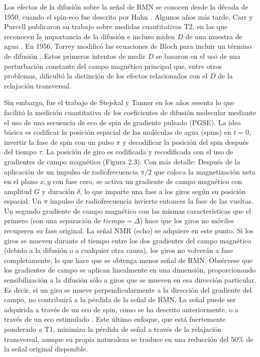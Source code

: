 Los efectos de la difusión sobre la señal de RMN se conocen desde la década de 1950, cuando el spin-eco fue descrito por Hahn \cite{Hahn_1950}. Algunos años más tarde, Carr y Purcell publicaron su trabajo sobre medidas cuantitativas T2, en las que reconocen la importancia de la difusión e incluso miden $D$ de una muestra de agua \cite{Carr_1954}. En 1956, Torrey modificó las ecuaciones de Bloch para incluir un término de difusión \cite{Torrey_1956}. Estos primeros intentos de medir $D$ se basaron en el uso de una perturbación constante del campo magnético principal que, entre otros problemas, dificultó la distinción de los efectos relacionados con el $D$ de la relajación transversal.

Sin embargo, fue el trabajo de Stejskal y Tanner \cite{Stejskal_1965} en los años sesenta lo que facilitó la medición cuantitativa de los coeficientes de difusión molecular mediante el uso de una secuencia de eco de spin de gradiente pulsado (PGSE). La idea básica es codificar la posición espacial de las moléculas de agua (spins) en $t = 0$, invertir la fase de spin con un pulso \(\pi\) y decodificar la posición del spin después del tiempo \(\tau\). La posición de giro es codificada y recodificada con el uso de gradientes de campo magnético (Figura 2.3). Con más detalle: Después de la aplicación de un impulso de radiofrecuencia $\pi/2$ que coloca la magnetización neta en el plano $x, y$ con fase cero, se activa un gradiente de campo magnético con amplitud $G$ y duración \(\delta\), lo que imparte una fase a los giros según su posición espacial. Un \(\pi\) impulso de radiofrecuencia invierte entonces la fase de las vueltas. Un segundo gradiente de campo magnético con las mismas características que el primero (con una separación de $tiempo = \Delta$) hace que los giros no móviles recuperen su fase original. La señal NMR (echo) se adquiere en este punto. Si los giros se mueven durante el tiempo entre los dos gradientes del campo magnético (debido a la difusión o a cualquier otra causa), los giros no volverán a fase completamente, lo que hace que se obtenga menos señal de RMN. Obsérvese que los gradientes de campo se aplican linealmente en una dimensión, proporcionando sensibilización a la difusión sólo a giros que se mueven en esa dirección particular. Es decir, si un giro se mueve perpendicularmente a la dirección del gradiente del campo, no contribuirá a la pérdida de la señal de RMN. La señal puede ser adquirida a través de un eco de spin, como se ha descrito anteriormente, o a través de un eco estimulado \cite{Tanner_1970}. Este último enfoque, que está fuertemente ponderado a T1, minimiza la pérdida de señal a través de la relajación transversal, aunque su propia naturaleza se traduce en una reducción del 50\% de la señal original disponible.

